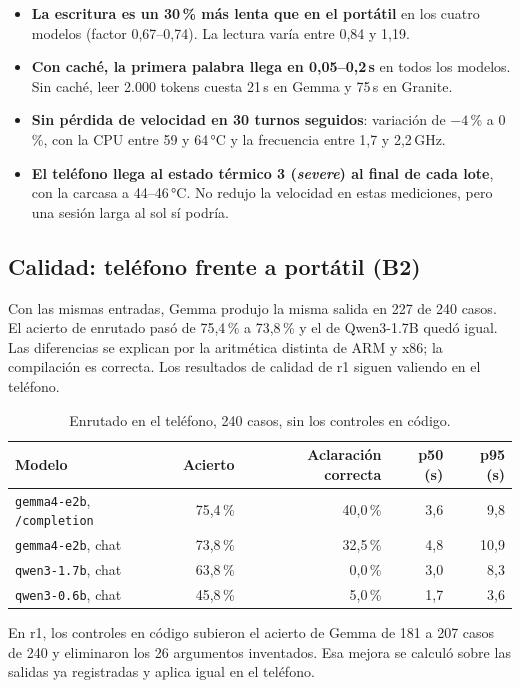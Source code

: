 \documentclass[11pt,a4paper]{article}
\newcommand{\m}[1]{\texttt{#1}}
\begin{document}
\begin{itemize}
\item \textbf{La escritura es un 30\,\% más lenta que en el portátil} en los cuatro modelos (factor 0,67--0,74). La lectura varía entre 0,84 y 1,19.
\item \textbf{Con caché, la primera palabra llega en 0,05--0,2\,s} en todos los modelos. Sin caché, leer 2.000 tokens cuesta 21\,s en Gemma y 75\,s en Granite.
\item \textbf{Sin pérdida de velocidad en 30 turnos seguidos}: variación de $-4$\,\% a $0$\,\%, con la CPU entre 59 y 64\,°C y la frecuencia entre 1,7 y 2,2\,GHz.
\item \textbf{El teléfono llega al estado térmico 3 (\emph{severe}) al final de cada lote}, con la carcasa a 44--46\,°C. No redujo la velocidad en estas mediciones, pero una sesión larga al sol sí podría.
\end{itemize}

\subsection{Calidad: teléfono frente a portátil (B2)}

Con las mismas entradas, Gemma produjo la misma salida en 227 de 240 casos. El acierto de enrutado pasó de 75,4\,\% a 73,8\,\% y el de Qwen3-1.7B quedó igual. Las diferencias se explican por la aritmética distinta de ARM y x86; la compilación es correcta. Los resultados de calidad de r1 siguen valiendo en el teléfono.

\begin{table}[H]
\centering\small
\caption{Enrutado en el teléfono, 240 casos, sin los controles en código.}\label{tab:route}
\begin{tabularx}{\textwidth}{@{}lRRRR@{}}
\toprule
Modelo & Acierto & Aclaración correcta & p50 (s) & p95 (s)\\
\midrule
\m{gemma4-e2b}, \m{/completion} & 75,4\,\% & 40,0\,\% & 3,6 & 9,8\\
\m{gemma4-e2b}, chat & 73,8\,\% & 32,5\,\% & 4,8 & 10,9\\
\m{qwen3-1.7b}, chat & 63,8\,\% & 0,0\,\% & 3,0 & 8,3\\
\m{qwen3-0.6b}, chat & 45,8\,\% & 5,0\,\% & 1,7 & 3,6\\
\bottomrule
\end{tabularx}
\end{table}

En r1, los controles en código subieron el acierto de Gemma de 181 a 207 casos de 240 y eliminaron los 26 argumentos inventados. Esa mejora se calculó sobre las salidas ya registradas y aplica igual en el teléfono.
\end{document}
